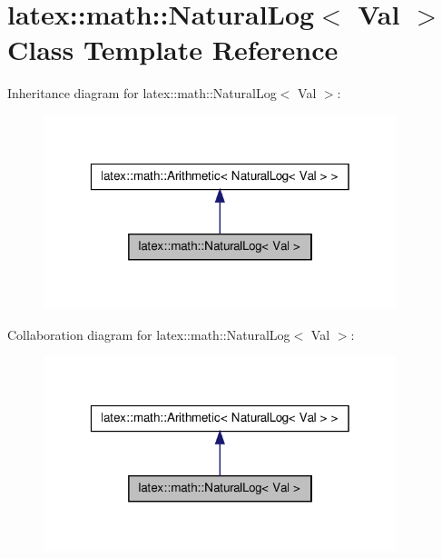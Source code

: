 \hypertarget{classlatex_1_1math_1_1NaturalLog}{\section{latex\-:\-:math\-:\-:\-Natural\-Log$<$ \-Val $>$ \-Class \-Template \-Reference}
\label{classlatex_1_1math_1_1NaturalLog}
}


\-Inheritance diagram for latex\-:\-:math\-:\-:\-Natural\-Log$<$ \-Val $>$\-:
\nopagebreak
\begin{figure}[H]
\begin{center}
\leavevmode
\includegraphics[width=292pt]{classlatex_1_1math_1_1NaturalLog__inherit__graph}
\end{center}
\end{figure}


\-Collaboration diagram for latex\-:\-:math\-:\-:\-Natural\-Log$<$ \-Val $>$\-:
\nopagebreak
\begin{figure}[H]
\begin{center}
\leavevmode
\includegraphics[width=292pt]{classlatex_1_1math_1_1NaturalLog__coll__graph}
\end{center}
\end{figure}
